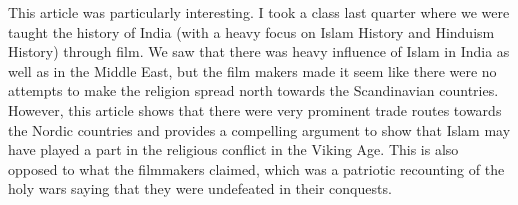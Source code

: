 \documentclass[a4paper]{article}
\begin{document}
        This article was particularly interesting. I took a class last quarter where we were taught the history of India 
        (with a heavy focus on Islam History and Hinduism History) through film. We saw that there was heavy influence of Islam in 
        India as well as in the Middle East, but the film makers made it seem like there were no attempts to make the religion 
        spread north towards the Scandinavian countries. However, this article shows that there were very prominent trade routes 
        towards the Nordic countries and provides a compelling argument to show that Islam may have played a part in the religious 
        conflict in the Viking Age. This is also opposed to what the filmmakers claimed, which was a patriotic recounting of the 
        holy wars saying that they were undefeated in their conquests. 

        \pagebreak
        
        
        \cite{EMikk}
\end{document}
